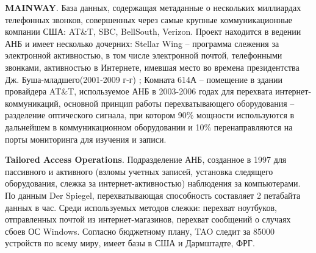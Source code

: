 	\textbf{MAINWAY}. База данных, содержащая метаданные о нескольких миллиардах телефонных звонков, совершенных через самые крупные коммуникационные компании США: AT\&T, SBC, BellSouth, Verizon. Проект находится в ведении  АНБ и имеет несколько дочерних: Stellar Wing -- программа слежения за электронной активностью, в том числе электронной почтой, телефонными звонками, активностью в Интернете, имевшая место во времена президентства Дж. Буша-младшего(2001-2009 г-г) \cite{MAINWAY1} \cite{MAINWAY2};%
	Комната 614А -- помещение в здании провайдера AT\&T, используемое АНБ в 2003-2006 годах для перехвата интернет-коммуникаций, \cite{614-1} \cite{614-2} %
	основной принцип работы перехватывающего оборудования -- разделение  оптического сигнала, при котором 90\% мощности  используются в дальнейшем в коммуникационном оборудовании и 10\% перенаправляются на порты мониторинга для изучения и записи.
	
	\textbf{Tailored Access Operations}. Подразделение АНБ, созданное в 1997 для пассивного и активного (взломы учетных записей, установка следящего оборудования, слежка за интернет-активностью) наблюдения за компьютерами. По данным Der Spiegel, перехватывающая способность составляет 2 петабайта данных в час. \cite{SPIEGEL} \cite{TAO2} \cite{TAO3} %
	Среди используемых методов слежки: перехват ноутбуков, отправленных почтой из интернет-магазинов, перехват сообщений о случаях сбоев ОС Windows. Согласно бюджетному плану, TAO следит за 85000 устройств по всему миру, имеет базы в США и Дармштадте, ФРГ. 
	

